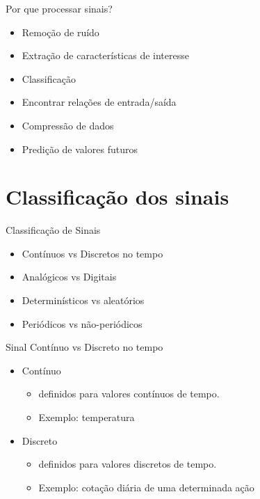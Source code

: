 \documentclass[aspectratio=169,
				xcolor=table]{beamer}
\begin{document}
	\begin{frame}{Por que processar sinais?}

		\begin{itemize}
			\item Remoção de ruído
			\vspace{.7em}
			\item Extração de características de interesse
			\vspace{.7em}
			\item Classificação
			\vspace{.7em}
			\item Encontrar relações de entrada/saída
			\vspace{.7em}
			\item Compressão de dados
			\vspace{.7em}
			\item Predição de valores futuros
		\end{itemize}	
		
	\end{frame}


	\section{Classificação dos sinais}	
	
	\begin{frame}{Classificação de Sinais}
		\begin{itemize}
			\item Contínuos vs Discretos no tempo
			\vspace{1em}
			\item Analógicos vs Digitais
			\vspace{1em}
			\item Determinísticos vs aleatórios
			\vspace{1em}
			\item Periódicos vs não-periódicos
			\vspace{1em}
		\end{itemize}		
	\end{frame}
	
	\begin{frame}{Sinal Contínuo vs Discreto no tempo}
		\begin{itemize}
			\item Contínuo 
			\begin{itemize}
				\item definidos para valores contínuos de tempo.
				\item Exemplo: temperatura
			\end{itemize}
			\vspace{1em}
			\item Discreto
			\begin{itemize}
				\item definidos para valores discretos de tempo. 
				\item Exemplo: cotação diária de uma determinada ação
			\end{itemize}
		\end{itemize}
	\end{frame}
	
\end{document}
